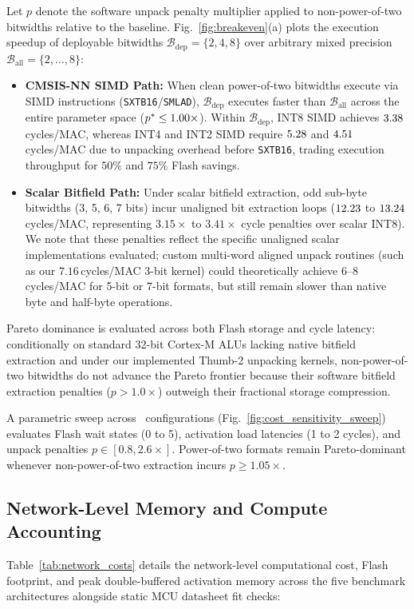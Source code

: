 \documentclass{ieeeaccess}
\begin{document}
Let $p$ denote the software unpack penalty multiplier applied to non-power-of-two bitwidths relative to the baseline. Fig.~\ref{fig:breakeven}(a) plots the execution speedup of deployable bitwidths $\mathcal{B}_{\text{dep}} = \{2, 4, 8\}$ over arbitrary mixed precision $\mathcal{B}_{\text{all}} = \{2, \dots, 8\}$:
\begin{itemize}
    \item \textbf{CMSIS-NN SIMD Path:} When clean power-of-two bitwidths execute via SIMD instructions (\texttt{SXTB16}/\texttt{SMLAD}), $\mathcal{B}_{\text{dep}}$ executes faster than $\mathcal{B}_{\text{all}}$ across the entire parameter space ($p^* \le 1.00\times$). Within $\mathcal{B}_{\text{dep}}$, INT8 SIMD achieves $3.38$\,cycles/MAC, whereas INT4 and INT2 SIMD require $5.28$ and $4.51$\,cycles/MAC due to unpacking overhead before \texttt{SXTB16}, trading execution throughput for $50\%$ and $75\%$ Flash savings.
    \item \textbf{Scalar Bitfield Path:} Under scalar bitfield extraction, odd sub-byte bitwidths (3, 5, 6, 7 bits) incur unaligned bit extraction loops ($12.23$ to $13.24$\,cycles/MAC, representing $3.15\times$ to $3.41\times$ cycle penalties over scalar INT8). We note that these penalties reflect the specific unaligned scalar implementations evaluated; custom multi-word aligned unpack routines (such as our $7.16$\,cycles/MAC 3-bit kernel) could theoretically achieve 6--8 cycles/MAC for 5-bit or 7-bit formats, but still remain slower than native byte and half-byte operations.
\end{itemize}
Pareto dominance is evaluated across both Flash storage and cycle latency: conditionally on standard 32-bit Cortex-M ALUs lacking native bitfield extraction and under our implemented Thumb-2 unpacking kernels, non-power-of-two bitwidths do not advance the Pareto frontier because their software bitfield extraction penalties ($p > 1.0\times$) outweigh their fractional storage compression.

A parametric sweep across \MacroSensitivitySweepPoints\ configurations (Fig.~\ref{fig:cost_sensitivity_sweep}) evaluates Flash wait states (0 to 5), activation load latencies (1 to 2 cycles), and unpack penalties $p \in [0.8, 2.6\times]$. Power-of-two formats remain Pareto-dominant whenever non-power-of-two extraction incurs $p \ge 1.05\times$.

\subsection{Network-Level Memory and Compute Accounting}
Table~\ref{tab:network_costs} details the network-level computational cost, Flash footprint, and peak double-buffered activation memory across the five benchmark architectures alongside static MCU datasheet fit checks:
\end{document}

